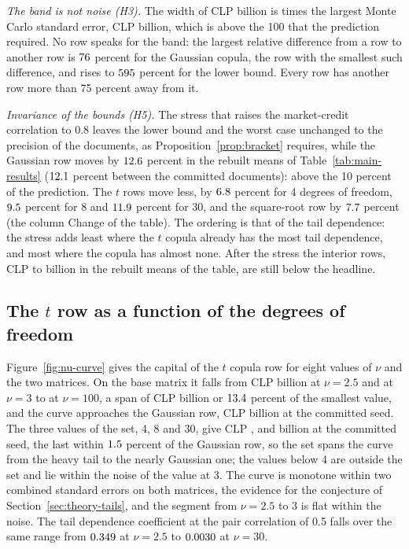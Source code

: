 \emph{The band is not noise (H3).} The width of CLP \bdWidth{} billion is \bdWidthOverSe{} times the largest Monte Carlo standard
error, CLP \bdMaxSe{} billion, which is above the 100 that the prediction required. No row speaks for the band: the largest relative difference from a row to another row is
$76$ percent for the Gaussian copula, the row with the smallest such difference, and rises to $595$ percent
for the lower bound. Every row has another row more than 75 percent away from it.

\emph{Invariance of the bounds (H5).} The stress that raises the market-credit correlation to 0.8 leaves the lower bound and the
worst case unchanged to the precision of the documents, as Proposition~\ref{prop:bracket} requires, while the Gaussian row moves by
$12.6$ percent in the rebuilt means of Table~\ref{tab:main-results} ($12.1$ percent between the committed documents): above the 10
percent of the prediction. The $t$ rows move less, by $6.8$ percent for 4 degrees of freedom, $9.5$ percent
for 8 and $11.9$ percent for 30, and the square-root row by $7.7$ percent (the column Change of the table). The ordering is that of the tail
dependence: the stress adds least where the $t$ copula already has the most tail dependence, and most where the copula has
almost none. After the stress the interior rows, CLP \bdStressRbMin{} to \bdStressRbMax{} billion in the rebuilt means of the table, are still below the headline.

\subsection{The \texorpdfstring{$t$}{t} row as a function of the degrees of freedom}
\label{sec:results-nu}

Figure~\ref{fig:nu-curve} gives the capital of the $t$ copula row for eight values of $\nu$ and the two matrices. On the base
matrix it falls from CLP \bdTTwoFive{} billion at $\nu=2.5$ and \bdTThree{} at $\nu=3$ to \bdTHundred{} at $\nu=100$, a span of
CLP \bdNuSpanBase{} billion or $13.4$ percent of the smallest value, and the curve approaches the Gaussian row, CLP \bdGauss{}
billion at the committed seed. The three values of the set, 4, 8 and 30, give CLP \bdTFour{}, \bdTEight{} and \bdTThirty{} billion at the committed seed, the last
within $1.5$ percent of the Gaussian row, so the set spans the curve from the heavy tail to the nearly Gaussian one;
the values below 4 are outside the set and lie within the noise of the value at 3.
The curve is monotone within two combined standard errors on both matrices, the evidence for the conjecture of
Section~\ref{sec:theory-tails}, and the segment from $\nu=2.5$ to $3$ is flat within the noise. The tail dependence coefficient at the pair
correlation of 0.5 falls over the same range from $0.349$ at $\nu=2.5$ to $0.0030$ at $\nu=30$.

